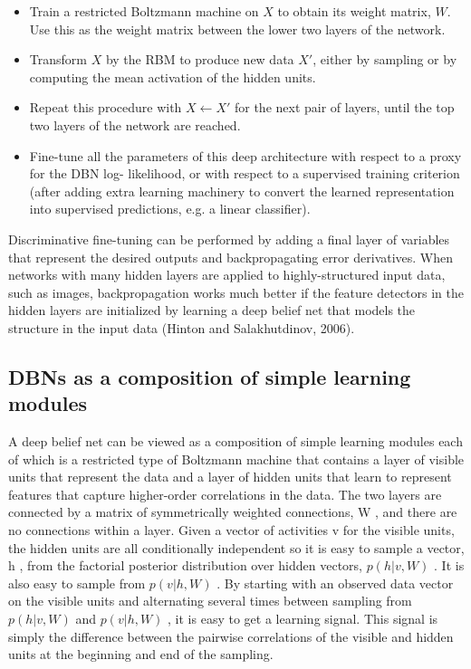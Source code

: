\documentclass{article}
\begin{document}
\begin{itemize}
    \item Train a restricted Boltzmann machine on $X$ to obtain its weight matrix, $W$. Use this as the weight matrix between the lower two layers of the network.
    \item Transform $X$ by the RBM to produce new data $X'$, either by sampling or by computing the mean activation of the hidden units.
    \item Repeat this procedure with $X \leftarrow X'$ for the next pair of layers, until the top two layers of the network are reached.
    \item Fine-tune all the parameters of this deep architecture with respect to a proxy for the DBN log- likelihood, or with respect to a supervised training criterion (after adding extra learning machinery to convert the learned representation into supervised predictions, e.g. a linear classifier).
\end{itemize}

Discriminative fine-tuning can be performed by adding a final layer of variables that represent the desired outputs and backpropagating error derivatives. When networks with many hidden layers are applied to highly-structured input data, such as images, backpropagation works much better if the feature detectors in the hidden layers are initialized by learning a deep belief net that models the structure in the input data (Hinton and Salakhutdinov, 2006).

\subsection{DBNs as a composition of simple learning modules}

A deep belief net can be viewed as a composition of simple learning modules each of which is a restricted type of Boltzmann machine that contains a layer of visible units that represent the data and a layer of hidden units that learn to represent features that capture higher-order correlations in the data. The two layers are connected by a matrix of symmetrically weighted connections, W , and there are no connections within a layer. Given a vector of activities v for the visible units, the hidden units are all conditionally independent so it is easy to sample a vector, h , from the factorial posterior distribution over hidden vectors, $p(h|v,W)$ . It is also easy to sample from $p(v|h,W)$ . By starting with an observed data vector on the visible units and alternating several times between sampling from $p(h|v,W)$ and $p(v|h,W)$ , it is easy to get a learning signal. This signal is simply the difference between the pairwise correlations of the visible and hidden units at the beginning and end of the sampling.
\end{document}
